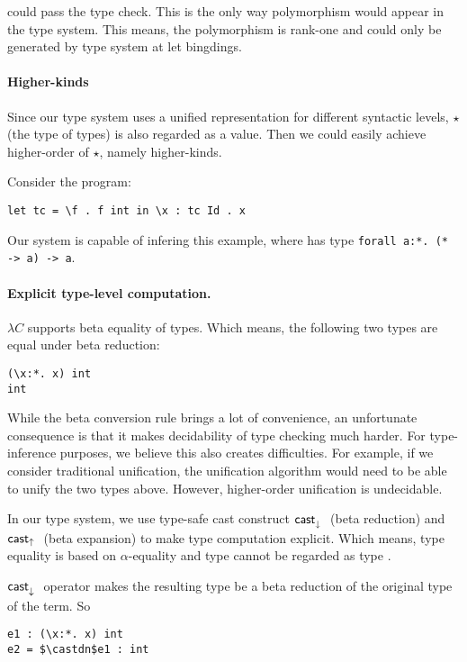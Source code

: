 could pass the type check. This is the only way polymorphism would
appear in the type system. This means, the polymorphism is rank-one
and could only be generated by type system at let bingdings.

\paragraph{Higher-kinds} Since our type system uses a unified representation for different syntactic levels, $\star$ (the type of types) is also regarded as a value. Then we could easily achieve higher-order of $\star$, namely higher-kinds.

Consider the program:

\begin{lstlisting}
let tc = \f . f int in \x : tc Id . x
\end{lstlisting}

Our system is capable of infering this example, where  has type \lstinline{forall a:*. (* -> a) -> a}.

\paragraph{Explicit type-level computation.} $\lambda C$ supports beta
equality of types. Which means, the following two types are equal
under beta reduction:

\begin{lstlisting}
(\x:*. x) int
int
\end{lstlisting}

While the beta conversion rule brings a lot of convenience, an
unfortunate consequence is that it makes decidability of type
checking much harder. For type-inference purposes, we believe
this also creates difficulties. For example, if we consider
traditional unification, the unification algorithm would need
to be able to unify the two types above. However, higher-order
unification is undecidable.

In our type system, we use type-safe cast construct $\mathsf{cast}_\downarrow^{}~$ (beta
reduction) and $\mathsf{cast}_\uparrow~$ (beta expansion) to make type computation
explicit. Which means, type equality is based on $\alpha$-equality and
type  cannot be regarded as type .

$\mathsf{cast}_\downarrow^{}~$ operator makes the resulting type be a beta reduction of the
original type of the term. So

\begin{lstlisting}
e1 : (\x:*. x) int
e2 = $\castdn$e1 : int
\end{lstlisting}

